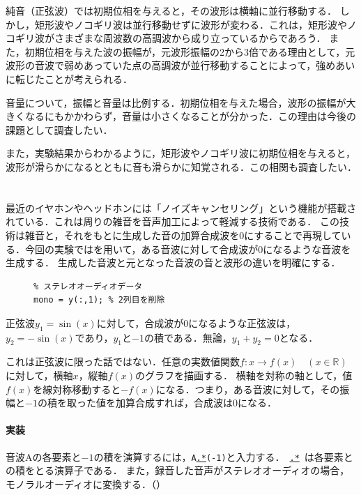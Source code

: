 \consideration
純音（正弦波）では初期位相を与えると，その波形は横軸に並行移動する．
しかし，矩形波やノコギリ波は並行移動せずに波形が変わる．これは，矩形波やノコギリ波がさまざまな周波数の高調波から成り立っているからであろう．
また，初期位相を与えた波の振幅が，元波形振幅の2から3倍である理由として，元波形の音波で弱めあっていた点の高調波が並行移動することによって，強めあいに転じたことが考えられる．\par
音量について，振幅と音量は比例する．初期位相を与えた場合，波形の振幅が大きくなるにもかかわらず，音量は小さくなることが分かった．この理由は今後の課題として調査したい．\par
また，実験結果からわかるように，矩形波やノコギリ波に初期位相を与えると，波形が滑らかになるとともに音も滑らかに知覚される．この相関も調査したい．
\section{\kadaicb}\label{sec:\kadaicb}
\purpose
最近のイヤホンやヘッドホンには「ノイズキャンセリング」という機能が搭載されている．これは周りの雑音を音声加工によって軽減する技術である．
この技術は雑音と，それをもとに生成した音の加算合成波を\(0\)にすることで再現している．今回の実験では\matlab を用いて，ある音波に対して合成波が\(0\)になるような音波を生成する．
生成した音波と元となった音波の音と波形の違いを明確にする．
\method
\begin{figure}
    \vspace{-2cm}
    \centering
    \begin{lstlisting}[caption={モノラルへの変換},label={src:モノラルへの変換},numbers={none}]
% y : N行2列
% ステレオオーディオデータ
mono = y(:,1); % 2列目を削除
    \end{lstlisting}
    \vspace{-1cm}
\end{figure}
正弦波\(y_1=\sin(x)\)に対して，合成波が\(0\)になるような正弦波は，\(y_2=-\sin(x)\)であり，\(y_1\)と\(-1\)の積である．無論，\(y_1+y_2=0\)となる．\par
これは正弦波に限った話ではない．任意の実数値関数\(f:x\longrightarrow f(x)\quad(x\in\mathbb{R})\)に対して，横軸\(x\)，縦軸\(f(x)\)のグラフを描画する．
横軸を対称の軸として，値\(f(x)\)を線対称移動すると\(-f(x)\)になる．つまり，ある音波に対して，その振幅と\(-1\)の積を取った値を加算合成すれば，合成波は\(0\)になる．
\paragraph{実装}
音波Aの各要素と\(-1\)の積を演算するには，\texttt{A\underline{.*}(-1)}と入力する．\ \underline{\texttt{.*}}\ は各要素との積をとる演算子である．
また，録音した音声がステレオオーディオの場合，モノラルオーディオに変換する．（）
